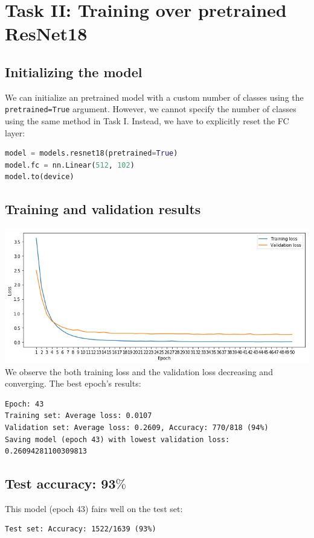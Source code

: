 \documentclass[twocolumn,9pt]{article}
\begin{document}
\section{Task II: Training over pretrained ResNet18}
\subsection*{Initializing the model}
We can initialize an pretrained model with a custom number of classes using the \lstinline{pretrained=True}
argument. However, we cannot specify the number of classes using the same method in Task I. Instead, we have
to explicitly reset the FC layer:
\begin{lstlisting}[language=Python]
model = models.resnet18(pretrained=True)
model.fc = nn.Linear(512, 102)
model.to(device)
\end{lstlisting}

\subsection*{Training and validation results}
\includegraphics[width=\columnwidth]{task2.png}
We observe the both training loss and the validation loss decreasing and converging. The best
epoch's results:
\begin{lstlisting}
Epoch: 43
Training set: Average loss: 0.0107
Validation set: Average loss: 0.2609, Accuracy: 770/818 (94%)
Saving model (epoch 43) with lowest validation loss: 0.26094281100309813
\end{lstlisting}

\subsection*{Test accuracy: 93$\%$}
This model (epoch 43) fairs well on the test set:
\begin{lstlisting}
Test set: Accuracy: 1522/1639 (93%)
\end{lstlisting}
\end{document}
